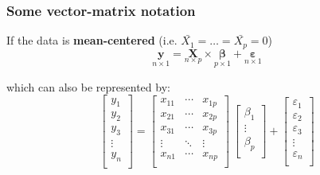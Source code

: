 \documentclass[12pt]{beamer}\usepackage[]{graphicx}\usepackage[]{color}
\begin{document}

\begin{frame}
\frametitle{Some vector-matrix notation}

If the data is \textbf{mean-centered} (i.e. $\bar{X_1} = \dots = \bar{X_p} = 0$)
$$
\underset{n\times 1}{\mathbf{y}} =  \underset{n \times p}{\mathbf{X}} \times 
\underset{p\times 1}{\boldsymbol{\beta}} + \underset{n\times 1}{\boldsymbol{\varepsilon}}
$$

which can also be represented by:
$$
\begin{bmatrix} 
y_1 \\
y_2 \\
y_3 \\
\vdots \\
y_n \\
\end{bmatrix}
=
\begin{bmatrix} 
x_{11} & \cdots & x_{1p} \\
x_{21} & \cdots & x_{2p} \\
x_{31} & \cdots & x_{3p} \\
\vdots & \ddots & \vdots \\
x_{n1} & \cdots & x_{np} \\
\end{bmatrix}
\
\begin{bmatrix} 
\beta_1 \\ 
\vdots \\
\beta_p \\
\end{bmatrix}
+
\begin{bmatrix} 
\varepsilon_1 \\
\varepsilon_2 \\
\varepsilon_3 \\
\vdots \\
\varepsilon_n \\
\end{bmatrix}
$$

\end{frame}


\begin{frame}
\begin{center}
\Huge{}
\end{center}
\end{frame}

\end{document}
